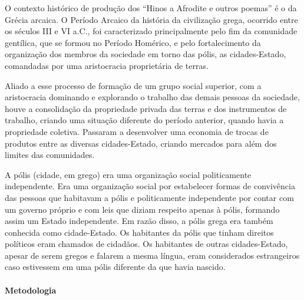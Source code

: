 \documentclass[12pt]{extarticle}
\begin{document}
O contexto histórico de produção dos ``Hinos a Afrodite e outros poemas'' 
é o da Grécia arcaica. O Período Arcaico da história da civilização grega, 
ocorrido entre os séculos \textsc{III} e \textsc{VI} a.C., foi caracterizado 
principalmente pelo fim da comunidade gentílica, que se formou no Período 
Homérico, e pelo fortalecimento da organização dos membros da sociedade em 
torno das pólis, as cidades-Estado, comandadas por uma aristocracia proprietária de terras.

Aliado a esse processo de formação de um grupo social superior, com a aristocracia 
dominando e explorando o trabalho das demais pessoas da sociedade, houve a consolidação 
da propriedade privada das terras e dos instrumentos de trabalho, criando uma situação 
diferente do período anterior, quando havia a propriedade coletiva. Passaram a desenvolver 
uma economia de trocas de produtos entre as diversas cidades-Estado, criando mercados para 
além dos limites das comunidades.

A pólis (cidade, em grego) era uma organização social politicamente independente. 
Era uma organização social por estabelecer formas de convivência das pessoas que 
habitavam a pólis e politicamente independente por contar com um governo próprio 
e com leis que diziam respeito apenas à pólis, formando assim um Estado independente. 
Em razão disso, a pólis grega era também conhecida como cidade-Estado. Os habitantes 
da pólis que tinham direitos políticos eram chamados de cidadãos. Os habitantes de outras 
cidades-Estado, apesar de serem gregos e falarem a mesma língua, eram considerados 
estrangeiros caso estivessem em uma pólis diferente da que havia nascido.


\paragraph{Metodologia}
\end{document}
